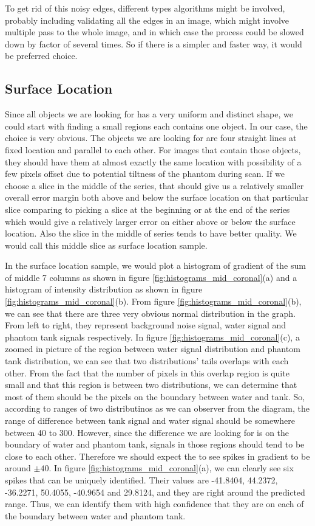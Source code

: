 To get rid of this noisy edges, different types algorithms might be involved, probably including validating
all the edges in an image,
which might involve multiple pass to the whole image, and in which case the process
could be slowed down by factor of several times. So if there is a simpler and faster way, it would be preferred
choice.

\subsection{Surface Location}

Since all objects we are looking for has a very uniform and distinct shape, we could start with finding a small 
regions each contains one object. In our case, the choice is very obvious. The objects we are looking for are
four straight lines at fixed location and parallel to each other. For images that contain those objects, they
should have them at almost exactly the same location with possibility of a few pixels offset due to potential
tiltness of the phantom during scan. If we choose a slice in the middle of the series, that should give us a
relatively smaller overall error margin both above and below the surface location on that particular slice
comparing to picking a slice at the beginning or at the end of the series which would give a relatively larger 
error on either above or below the surface location. Also the slice in the middle of series tends to have better 
quality. We would call this middle slice as surface location sample.

In the surface location sample, we would plot a histogram of gradient of the sum of middle 7 columns as shown
in figure \ref{fig:histograms_mid_coronal}(a) and a histogram of intensity distribution as shown in
figure \ref{fig:histograms_mid_coronal}(b). From figure \ref{fig:histograms_mid_coronal}(b), we can see that there
are three very obvious normal distribution in the graph. 
From left to right, they represent background noise signal, water signal and phantom tank signals respectively.
In figure \ref{fig:histograms_mid_coronal}(c), a zoomed in picture of the region between water signal distribution
and phantom tank distribution, we can see that two distributions' tails overlaps with each other. From the fact 
that the number of pixels in this overlap region is quite small and that this region is between two 
distributions, we can determine that most of them should be the pixels on the boundary between water and tank.
So, according to ranges of two distributinos as we can observer from the diagram, the range of difference
between tank signal and water signal should be somewhere between 40 to 300. However, since the difference we are
looking for is on the boundary of water and phantom tank, signals in those regions should tend to be close 
to each other. Therefore we should expect the to see spikes in gradient to be around $\pm40$. In figure
\ref{fig:histograms_mid_coronal}(a), we can clearly see six spikes that can be uniquely identified.
Their values are -41.8404, 44.2372, -36.2271, 50.4055, -40.9654 and 29.8124, and they are right around the 
predicted range. Thus, we can identify them with high confidence that they are on each of the boundary between
water and phantom tank.

